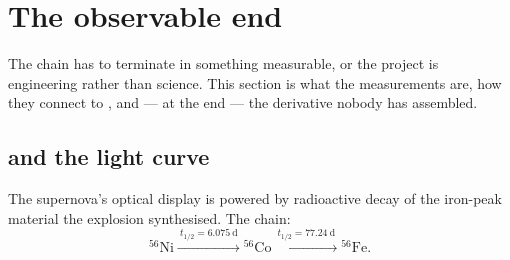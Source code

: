 %
%
%
%

\section{The observable end}
\label{part:observables}

The chain has to terminate in something measurable, or the project is
engineering rather than science. This section is what the measurements are,
how they connect to \Ye, and --- at the end --- the derivative nobody has
assembled.

\subsection{\texorpdfstring{}{56Ni} and the light curve}
\label{sec:ni56}

The supernova's optical display is powered by radioactive decay of the
iron-peak material the explosion synthesised. The chain:
%
\begin{equation}\label{eq:nichain}
{}^{56}\mathrm{Ni} \xrightarrow{\ t_{1/2} = 6.075\ \mathrm{d}\ } {}^{56}\mathrm{Co}
\xrightarrow{\ t_{1/2} = 77.24\ \mathrm{d}\ } {}^{56}\mathrm{Fe} .
\end{equation}

